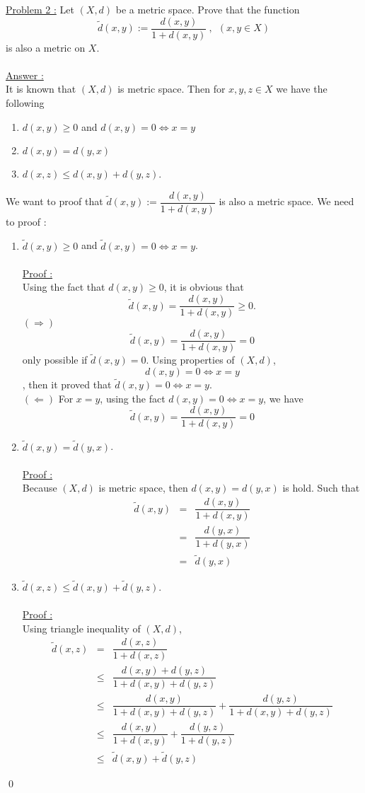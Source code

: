 \documentclass[a4paper,10pt]{article}
\begin{document}
\underline{Problem 2 :} Let $ (X,d) $ be a metric space. Prove that the function
\[ \tilde{d}(x,y) := \dfrac{d(x,y)}{1+d(x,y)} \ , \ \ (x,y\in X)   \]
is also a metric on $ X $. \\ \\
\underline{Answer :} \\
It is known that $ (X,d) $ is metric space. Then for $ x,y,z \in X $ we have the following
\begin{enumerate}
	\item $ d(x,y) \geq 0 $ and $ d(x,y)=0 \Leftrightarrow x=y $
	\item $ d(x,y) =d(y,x) $
	\item $ d(x,z) \leq d(x,y) + d(y,z) $.
\end{enumerate}
We want to proof that $ \tilde{d}(x,y) := \dfrac{d(x,y)}{1+d(x,y)} $ is also a metric space. We need to proof :
\begin{enumerate}
	\item $ \tilde{d}(x,y) \geq 0 $ and $ \tilde{d}(x,y)=0 \Leftrightarrow x=y $. \\ \\
	\underline{Proof : } \\
	Using the fact that $ d(x,y) \geq 0 $, it is obvious that 
	\[ \tilde{d}(x,y) = \dfrac{d(x,y)}{1+d(x,y)} \geq 0. \]
	$ (\Rightarrow) $  \[\tilde{d} (x,y) = \dfrac{d(x,y)}{1+d(x,y)} =0\] only possible if $ \tilde{d}(x,y)=0 $. Using properties of $ (X,d) $,  \[d(x,y)=0 \Leftrightarrow x=y \], then it proved that $ \tilde{d}(x,y)=0 \Leftrightarrow x=y $. \\
	$ (\Leftarrow) $ For $ x=y $, using the fact $ d(x,y)=0 \Leftrightarrow x=y $, we have
	\[  \tilde{d}(x,y) = \dfrac{d(x,y)}{1+d(x,y)} =0 \]
	\item $ \tilde{d}(x,y) = \tilde{d}(y,x) $. \\ \\
	\underline{Proof : } \\
	Because $ (X,d) $ is metric space, then $ d(x,y) =d(y,x) $ is hold. Such that
	\begin{eqnarray}\nonumber
	\tilde{d}(x,y) &=& \dfrac{d(x,y)}{1+d(x,y)} \\ \nonumber
	&=& \dfrac{d(y,x)}{1+d(y,x)}\\ \nonumber
	&=& \tilde{d}(y,x)
	\end{eqnarray}
	\item $ \tilde{d}(x,z) \leq \tilde{d}(x,y) + \tilde{d}(y,z) $. \\ \\
	\underline{Proof :}\\
	Using triangle inequality of $ (X,d) $,
	\begin{eqnarray}\nonumber
	\tilde{d}(x,z) &=& \dfrac{d(x,z)}{1+d(x,z)} \\ \nonumber
	&\leq&  \dfrac{d(x,y)+d(y,z)}{1+d(x,y)+d(y,z)} \\ \nonumber
	&\leq& \dfrac{d(x,y)}{1+d(x,y)+d(y,z)} +\dfrac{d(y,z)}{1+d(x,y)+d(y,z)} \\ \nonumber
	&\leq& \dfrac{d(x,y)}{1+d(x,y)} +\dfrac{d(y,z)}{1+d(y,z)} \\ \nonumber
	&\leq& \tilde{d}(x,y) + \tilde{d}(y,z)
	\end{eqnarray}
\end{enumerate}\qed
\end{document}
